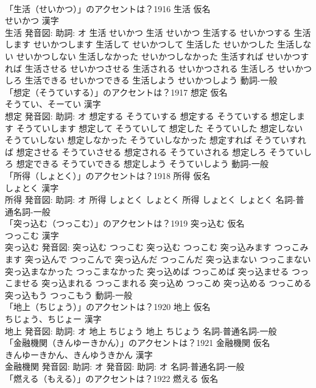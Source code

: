 \documentclass[8pt]{extreport}
\begin{document}
\begin{CJK}{UTF8}{min}
\\	「生活（せいかつ）」のアクセントは？1916	生活 仮名　
\\	せいかつ 漢字　
\\	生活 発音図: 助詞: オ	生活 せいかつ		生活 せいかつ 生活する せいかつする 生活します せいかつします 生活して せいかつして 生活した せいかつした 生活しない せいかつしない 生活しなかった せいかつしなかった 生活すれば せいかつすれば 生活させる せいかつさせる 生活される せいかつされる 生活しろ せいかつしろ 生活できる せいかつできる 生活しよう せいかつしよう				動詞-一般 
\\	「想定（そうていする）」のアクセントは？1917	想定 仮名　
\\	そうてい、そーてい 漢字　
\\	想定 発音図: 助詞: オ	想定する そうていする		想定する そうていする 想定します そうていします 想定して そうていして 想定した そうていした 想定しない そうていしない 想定しなかった そうていしなかった 想定すれば そうていすれば 想定させる そうていさせる 想定される そうていされる 想定しろ そうていしろ 想定できる そうていできる 想定しよう そうていしよう				動詞-一般 
\\	「所得（しょとく）」のアクセントは？1918	所得 仮名　
\\	しょとく 漢字　
\\	所得 発音図: 助詞: オ	所得 しょとく しょとく		所得 しょとく しょとく				名詞-普通名詞-一般 
\\	「突っ込む（つっこむ）」のアクセントは？1919	突っ込む 仮名　
\\	つっこむ 漢字　
\\	突っ込む 発音図:	突っ込む つっこむ		突っ込む つっこむ 突っ込みます つっこみます 突っ込んで つっこんで 突っ込んだ つっこんだ 突っ込まない つっこまない 突っ込まなかった つっこまなかった 突っ込めば つっこめば 突っ込ませる つっこませる 突っ込まれる つっこまれる 突っ込め つっこめ 突っ込める つっこめる 突っ込もう つっこもう				動詞-一般 
\\	「地上（ちじょう）」のアクセントは？1920	地上 仮名　
\\	ちじょう、ちじょー 漢字　
\\	地上 発音図: 助詞: オ	地上 ちじょう		地上 ちじょう				名詞-普通名詞-一般 
\\	「金融機関（きんゆーきかん）」のアクセントは？1921	金融機関 仮名　
\\	きんゆーきかん、きんゆうきかん 漢字　
\\	金融機関 発音図: 助詞: オ 発音図: 助詞: オ							名詞-普通名詞-一般 
\\	「燃える（もえる）」のアクセントは？1922	燃える 仮名　

\end{CJK}
\end{document}
